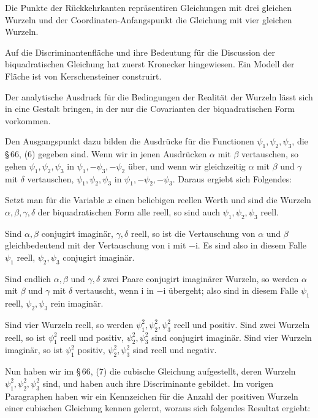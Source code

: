 \documentclass[11pt]{article}
\providecommand{\ii}{\mathrm{i}}
\begin{document}
Die Punkte der R\"uckkehrkanten repr\"asentiren Gleichungen mit drei gleichen Wurzeln und der Coordinaten-Anfangspunkt die Gleichung mit vier gleichen Wurzeln.

Auf die Discriminantenfl\"ache und ihre Bedeutung f\"ur die Discussion der biquadratischen Gleichung hat zuerst Kronecker hingewiesen. Ein Modell der Fl\"ache ist von Kerschensteiner construirt.

Der analytische Ausdruck f\"ur die Bedingungen der Realit\"at der Wurzeln l\"asst sich in eine Gestalt bringen, in der nur die Covarianten der biquadratischen Form vorkommen.

Den Ausgangspunkt dazu bilden die Ausdr\"ucke f\"ur die Functionen $\psi_1,\psi_2,\psi_3$, die \S\,66, (6) gegeben sind. Wenn wir in jenen Ausdr\"ucken $\alpha$ mit $\beta$ vertauschen, so gehen $\psi_1,\psi_2,\psi_3$ in $\psi_1,-\psi_3,-\psi_2$ \"uber, und wenn wir gleichzeitig $\alpha$ mit $\beta$ und $\gamma$ mit $\delta$ vertauschen, $\psi_1,\psi_2,\psi_3$ in $\psi_1,-\psi_2,-\psi_3$. Daraus ergiebt sich Folgendes:

Setzt man f\"ur die Variable $x$ einen beliebigen reellen Werth und sind die Wurzeln $\alpha,\beta,\gamma,\delta$ der biquadratischen Form alle reell, so sind auch $\psi_1,\psi_2,\psi_3$ reell.

Sind $\alpha,\beta$ conjugirt imagin\"ar, $\gamma,\delta$ reell, so ist die Vertauschung von $\alpha$ und $\beta$ gleichbedeutend mit der Vertauschung von $\ii$ mit $-\ii$. Es sind also in diesem Falle $\psi_1$ reell, $\psi_2,\psi_3$ conjugirt imagin\"ar.

Sind endlich $\alpha,\beta$ und $\gamma,\delta$ zwei Paare conjugirt imagin\"arer Wurzeln, so werden $\alpha$ mit $\beta$ und $\gamma$ mit $\delta$ vertauscht, wenn $\ii$ in $-\ii$ \"ubergeht; also sind in diesem Falle $\psi_1$ reell, $\psi_2,\psi_3$ rein imagin\"ar.

Sind vier Wurzeln reell, so werden $\psi_1^2,\psi_2^2,\psi_3^2$ reell und positiv. Sind zwei Wurzeln reell, so ist $\psi_1^2$ reell und positiv, $\psi_2^2,\psi_3^2$ sind conjugirt imagin\"ar. Sind vier Wurzeln imagin\"ar, so ist $\psi_1^2$ positiv, $\psi_2^2,\psi_3^2$ sind reell und negativ.

Nun haben wir im \S\,66, (7) die cubische Gleichung aufgestellt, deren Wurzeln $\psi_1^2,\psi_2^2,\psi_3^2$ sind, und haben auch ihre Discriminante gebildet. Im vorigen Paragraphen haben wir ein Kennzeichen f\"ur die Anzahl der positiven Wurzeln einer cubischen Gleichung kennen gelernt, woraus sich folgendes Resultat ergiebt:
\end{document}
